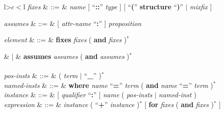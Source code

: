 \begin{isabellebody}
\begin{isamarkuptext}
\begin{table}
\begin{center}
\begin{tabular}{l>$c<$l}
  \textit{fixes} & ::=
  & \textit{name} [ ``\textbf{::}'' \textit{type} ]
    [ ``\textbf{(}'' \textbf{structure} ``\textbf{)}'' $|$
    \textit{mixfix} ] \\
\begin{comment}
  \textit{constrains} & ::=
  & \textit{name} ``\textbf{::}'' \textit{type} \\
\end{comment}
  \textit{assumes} & ::=
  & [ \textit{attr-name} ``\textbf{:}'' ] \textit{proposition} \\
\begin{comment}
  \textit{defines} & ::=
  & [ \textit{attr-name} ``\textbf{:}'' ] \textit{proposition} \\
  \textit{notes} & ::=
  & [ \textit{attr-name} ``\textbf{=}'' ]
    ( \textit{qualified-name} [ \textit{attribute} ] )$^+$ \\
\end{comment}

  \textit{element} & ::=
  & \textbf{fixes} \textit{fixes} ( \textbf{and} \textit{fixes} )$^*$ \\
\begin{comment}
  & |
  & \textbf{constrains} \textit{constrains}
    ( \textbf{and} \textit{constrains} )$^*$ \\
\end{comment}
  & |
  & \textbf{assumes} \textit{assumes} ( \textbf{and} \textit{assumes} )$^*$ \\[2ex]

   \\

  \textit{pos-insts} & ::=
  & ( \textit{term} $|$ ``\textbf{\_}'' )$^*$ \\
  \textit{named-insts} & ::=
  & \textbf{where} \textit{name} ``\textbf{=}'' \textit{term}
  ( \textbf{and} \textit{name} ``\textbf{=}'' \textit{term} )$^*$ \\
  \textit{instance} & ::=
  & [ \textit{qualifier} ``\textbf{:}'' ]
    \textit{name} ( \textit{pos-insts} $|$ \textit{named-inst} ) \\
  \textit{expression}  & ::= 
  & \textit{instance} ( ``\textbf{+}'' \textit{instance} )$^*$
    [ \textbf{for} \textit{fixes} ( \textbf{and} \textit{fixes} )$^*$ ] \\[2ex]


\end{tabular}
\end{center}
\end{table}
\end{isamarkuptext}
\end{isabellebody}
